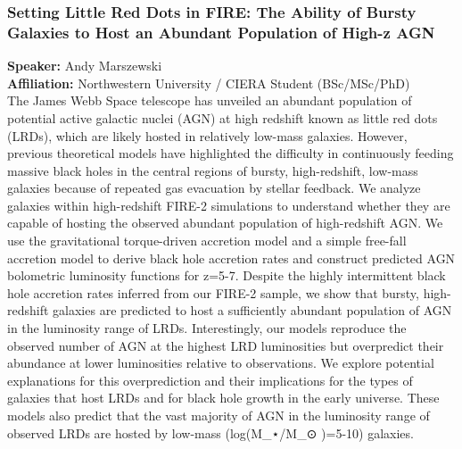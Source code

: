 \subsubsection*{Setting Little Red Dots in FIRE: The Ability of Bursty Galaxies to Host an Abundant Population of High-z AGN}
\textbf{Speaker:} Andy Marszewski \\
\textbf{Affiliation:} Northwestern University / CIERA \textperiodcentered{} Student (BSc/MSc/PhD)\\
The James Webb Space telescope has unveiled an abundant population of potential active galactic nuclei (AGN) at high redshift known as little red dots (LRDs), which are likely hosted in relatively low-mass galaxies. However, previous theoretical models have highlighted the difficulty in continuously feeding massive black holes in the central regions of bursty, high-redshift, low-mass galaxies because of repeated gas evacuation by stellar feedback. We analyze galaxies within high-redshift FIRE-2 simulations to understand whether they are capable of hosting the observed abundant population of high-redshift AGN. We use the gravitational torque-driven accretion model and a simple free-fall accretion model to derive black hole accretion rates and construct predicted AGN bolometric luminosity functions for z=5-7. Despite the highly intermittent black hole accretion rates inferred from our FIRE-2 sample, we show that bursty, high-redshift galaxies are predicted to host a sufficiently abundant population of AGN in the luminosity range of LRDs. Interestingly, our models reproduce the observed number of AGN at the highest LRD luminosities but overpredict their abundance at lower luminosities relative to observations. We explore potential explanations for this overprediction and their implications for the types of galaxies that host LRDs and for black hole growth in the early universe. These models also predict that the vast majority of AGN in the luminosity range of observed LRDs are hosted by low-mass (log⁡(M\_⋆/M\_⊙ )=5-10) galaxies.

\hypertarget{abs-61}{}
